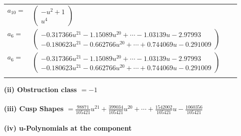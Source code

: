 \documentclass[1p]{elsarticle_modified}
\theoremstyle{definition}
\begin{document}
\begin{tabular}{m{7pt} m{180pt} m{7pt} m{180pt} }
\flushright $a_{10}=$&$\begin{pmatrix}- u^2+1\\u^4\end{pmatrix}$ \\
\flushright $a_{6}=$&$\begin{pmatrix}-0.317366 u^{21}-1.15089 u^{20}+\cdots-1.03139 u-2.97993\\-0.180623 u^{21}-0.662766 u^{20}+\cdots+0.744069 u-0.291009\end{pmatrix}$\\ \flushright $a_{6}=$&$\begin{pmatrix}-0.317366 u^{21}-1.15089 u^{20}+\cdots-1.03139 u-2.97993\\-0.180623 u^{21}-0.662766 u^{20}+\cdots+0.744069 u-0.291009\end{pmatrix}$\\&\end{tabular}
\flushleft \textbf{(ii) Obstruction class $= -1$}\\~\\
\flushleft \textbf{(iii) Cusp Shapes $= \frac{98871}{105421} u^{21}+\frac{399034}{105421} u^{20}+\cdots+\frac{1542002}{105421} u-\frac{1060356}{105421}$}\\~\\
\newpage\renewcommand{\arraystretch}{1}
\flushleft \textbf{(iv) u-Polynomials at the component}\newline \\
\end{document}
